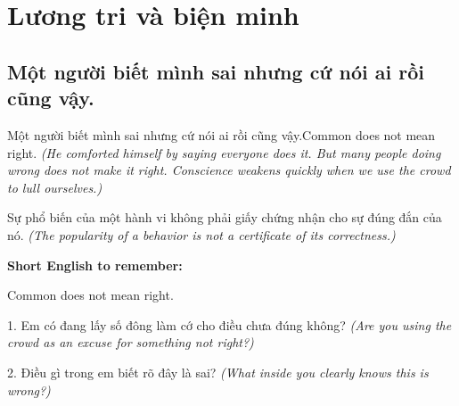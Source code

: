 \chapter{Lương tri và biện minh}

\section{Một người biết mình sai nhưng cứ nói ai rồi cũng vậy.}
\begin{truyen}{Một người biết mình sai nhưng cứ nói ai rồi cũng vậy.}{Common does not mean right.}
\textit{(He comforted himself by saying everyone does it. But many people doing wrong does not make it right. Conscience weakens quickly when we use the crowd to lull ourselves.)}
\end{truyen}
\begin{baihoc}
Sự phổ biến của một hành vi không phải giấy chứng nhận cho sự đúng đắn của nó.
\textit{(The popularity of a behavior is not a certificate of its correctness.)}
\end{baihoc}
\begin{ghinhoanh}\textbf{Short English to remember:}

Common does not mean right.
\end{ghinhoanh}
\begin{tuhocnhanh}
1. Em có đang lấy số đông làm cớ cho điều chưa đúng không? \textit{(Are you using the crowd as an excuse for something not right?)}

2. Điều gì trong em biết rõ đây là sai? \textit{(What inside you clearly knows this is wrong?)}
\end{tuhocnhanh}
\ngancach

